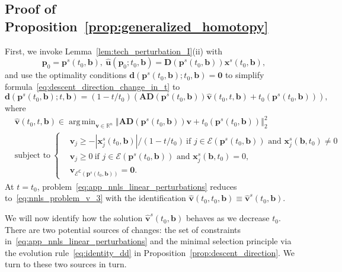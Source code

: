 \documentclass[11pt]{article}
\numberwithin{prop}{section}
\numberwithin{lem}{section}
\numberwithin{rem}{section}
\numberwithin{cor}{section}
\numberwithin{thm}{section}
\numberwithin{defn}{section}
\numberwithin{fact}{section}
\theoremstyle{plain}
\def\bb {\boldsymbol{b}}
\def\bd {\boldsymbol{d}}
\def\tzero {t_{0}}
\def\bp {\boldsymbol{p}}
\def\bu {\boldsymbol{u}}
\def\bv {\boldsymbol{v}}
\def\bx {\boldsymbol{x}}
\def\R {\mathbb{R}}
\newcommand{\normsq}[1]{\left\Vert{#1} \right\Vert_{2}^{2}}
\newcommand{\matr}[1]{\bm{#1}}
\def\Rn {\R^n}
\DeclareMathOperator*{\argmin}{arg\,min}
\def\bpo {\bp_{0}}
\def\eqset {\mathcal{E}}
\def\eqcset {\mathcal{E}^{\mathsf{C}}}
\begin{document}
\subsection{Proof of Proposition~\ref{prop:generalized_homotopy}} \label{app:generalized_homotopy}
First, we invoke Lemma~\ref{lem:tech_perturbation_I}(ii) with 
\[
\bpo = \bp^{s}(\tzero,\bb), \ \hat{\bu}(\bpo;\tzero,\bb) = \matr{D}(\bp^{s}(\tzero,\bb))\bx^{s}(\tzero,\bb),
\]
and use the optimality conditions $\bd(\bp^{s}(\tzero,\bb);\tzero,\bb) = \boldsymbol{0}$ to simplify formula~\eqref{eq:descent_direction_change_in_t} to
\begin{equation}\label{eq:app_dd_linear_perturbations}
\bd(\bp^{s}(\tzero,\bb);t, \bb) = (1-t/\tzero)(\matr{A}\matr{D}(\bp^{s}(\tzero,\bb))\hat{\bv}(\tzero,t,\bb) + \tzero(\bp^{s}(\tzero,\bb))),
\end{equation}
where
    \begin{equation}\label{eq:app_nnls_linear_perturbations}
    \begin{alignedat}{1}
        &\hat{\bv}(\tzero, t,\bb) \in \argmin_{\bv \in \Rn} \normsq{\matr{A}\matr{D}(\bp^{s}(\tzero,\bb))\bv + t_{0}(\bp^{s}(\tzero,\bb))} \\
        &\text{subject to} \
            \begin{cases}
                &\bv_{j} \geqslant -|\bx^{s}_{j}(\tzero,\bb)|/(1-t/\tzero) \ \text{if $j \in \eqset(\bp^{s}(\tzero,\bb))$ and $\bx^{s}_{j}(\bb,\tzero) \neq 0$}  \\
                &\bv_{j} \geqslant 0 \ \text{if $j \in \eqset(\bp^{s}(\tzero,\bb))$ and $\bx^{s}_{j}(\bb,\tzero) = 0$,} \\
                &\bv_{\eqcset(\bp^{s}(\tzero,\bb))} = \boldsymbol{0}.
            \end{cases}
        \end{alignedat}
	\end{equation}	
At $t = \tzero$, problem~\eqref{eq:app_nnls_linear_perturbations} reduces to~\eqref{eq:nnls_problem_v_3} with the identification $\hat{\bv}(\tzero,\tzero,\bb) \equiv \hat{\bv}^{s}(\tzero,\bb)$.


We will now identify how the solution $\hat{\bv}^{s}(\tzero,\bb)$ behaves as we decrease $\tzero$. There are two potential sources of changes: the set of constraints in~\eqref{eq:app_nnls_linear_perturbations} and the minimal selection principle via the evolution rule~\eqref{eq:identity_dd} in Proposition~\ref{prop:descent_direction}. We turn to these two sources in turn.
\end{document}

